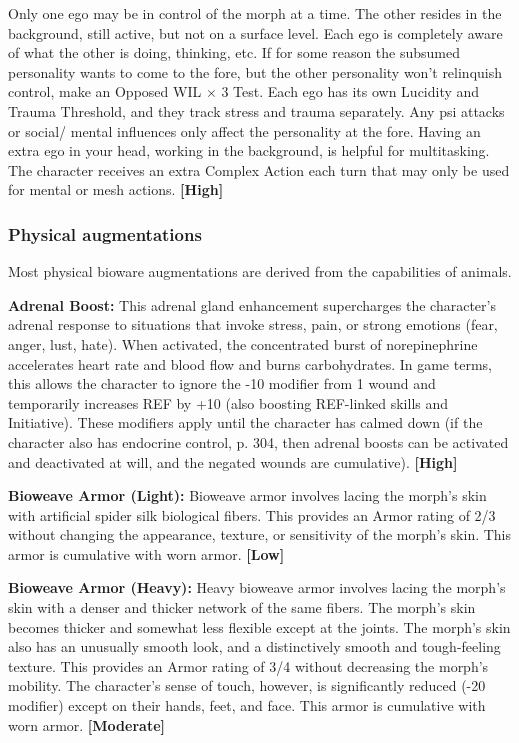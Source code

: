 Only one ego may be in control of the morph at a time. The other resides in the background, still active, but not on a surface level. Each ego is completely aware of what the other is doing, thinking, etc. If for some reason the subsumed personality wants to come to the fore, but the other personality won’t relinquish control, make an Opposed WIL $\times$ 3 Test. Each ego has its own Lucidity and Trauma Threshold, and they track stress and trauma separately. Any psi attacks or social/ mental influences only affect the personality at the fore. Having an extra ego in your head, working in the background, is helpful for multitasking. The character receives an extra Complex Action each turn that may only be used for mental or mesh actions. \textbf{[High]}

\subsubsection{Physical augmentations}

Most physical bioware augmentations are derived from the capabilities of animals.

\textbf{Adrenal Boost:} This adrenal gland enhancement supercharges the character’s adrenal response to situations that invoke stress, pain, or strong emotions (fear, anger, lust, hate). When activated, the concentrated burst of norepinephrine accelerates heart rate and blood flow and burns carbohydrates. In game terms, this allows the character to ignore the -10 modifier from 1 wound and temporarily increases REF by +10 (also boosting REF-linked skills and Initiative). These modifiers apply until the character has calmed down (if the character also has endocrine control, p. 304, then adrenal boosts can be activated and deactivated at will, and the negated wounds are cumulative). \textbf{[High]}

\textbf{Bioweave Armor (Light):} Bioweave armor involves lacing the morph’s skin with artificial spider silk biological fibers. This provides an Armor rating of 2/3 without changing the appearance, texture, or sensitivity of the morph’s skin. This armor is cumulative with worn armor. \textbf{[Low]}

\textbf{Bioweave Armor (Heavy):} Heavy bioweave armor involves lacing the morph’s skin with a denser and thicker network of the same fibers. The morph’s skin becomes thicker and somewhat less flexible except at the joints. The morph’s skin also has an unusually smooth look, and a distinctively smooth and tough-feeling texture. This provides an Armor rating of 3/4 without decreasing the morph’s mobility. The character’s sense of touch, however, is significantly reduced (-20 modifier) except on their hands, feet, and face. This armor is cumulative with worn armor. \textbf{[Moderate]}

